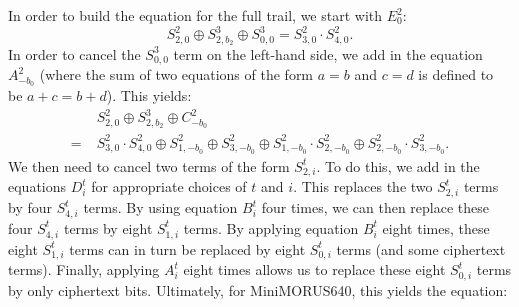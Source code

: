 \documentclass{llncs}
\newcommand{\cipher}[1]{\textsf{#1}}
\begin{document}
In order to build the equation for the full trail, we start with $E^2_0$:
\[
S^2_{2,0} \oplus S^{3}_{2,b_2} \oplus S^{3}_{0,0} = S^2_{3,0} \cdot S^2_{4,0}.
\]
In order to cancel the $S^{3}_{0,0}$ term on the left-hand side, we add in the equation $A^2_{-b_0}$ (where the sum of two equations of the form $a = b$ and $c = d$ is defined to be $a+c = b+d$). This yields:
\begin{align*}
&S^2_{2,0} \oplus S^3_{2,b_2} \oplus C^2_{-b_0}\\
=\; &S^2_{3,0} \cdot S^2_{4,0} \oplus S^2_{1,-b_0} \oplus S^2_{3,-b_0} \oplus S^2_{1,-b_0} \cdot S^2_{2,-b_0} \oplus S^2_{2,-b_0} \cdot S^2_{3,-b_0}.
\end{align*}
We then need to cancel two terms of the form $S^t_{2,i}$. To do this, we add in the equations $D^t_i$ for appropriate choices of $t$ and $i$. This replaces the two $S^t_{2,i}$ terms by four $S^t_{4,i}$ terms. By using equation $B^t_i$ four times, we can then replace these four $S^t_{4,i}$ terms by eight $S^t_{1,i}$ terms. By applying equation $B^t_i$ eight times, these eight $S^t_{1,i}$ terms can in turn be replaced by eight $S^t_{0,i}$ terms (and some ciphertext terms). Finally, applying $A^t_i$ eight times allows us to replace these eight $S^t_{0,i}$ terms by only ciphertext bits. Ultimately, for \cipher{MiniMORUS640}, this yields the equation:
\end{document}
